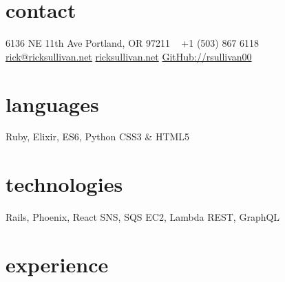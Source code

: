 \documentclass[]{friggeri-cv} %
\begin{document}


\begin{aside} %
\section{contact}
6136 NE 11th Ave
Portland, OR 97211
~
+1 (503) 867 6118
~
\href{mailto:rick@ricksullivan.net}{rick@ricksullivan.net}
\href{https://ricksullivan.net}{ricksullivan.net}
\href{https://github.com/rsullivan00}{GitHub://rsullivan00}
%
\section{languages}
Ruby, Elixir, ES6, Python
CSS3 \& HTML5
%
\section{technologies}
Rails, Phoenix, React
SNS, SQS
EC2, Lambda
REST, GraphQL
\end{aside}


\section{experience}
\end{document}
